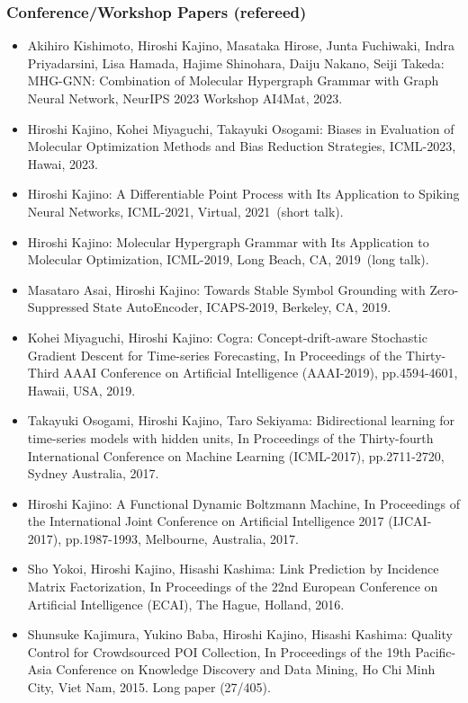 \documentclass[a4paper,9pt]{article}
\begin{document}
\subsubsection*{Conference/Workshop Papers (refereed)}
\begin{itemize}
 \item Akihiro Kishimoto, Hiroshi Kajino, Masataka Hirose, Junta Fuchiwaki, Indra Priyadarsini, Lisa Hamada, Hajime Shinohara, Daiju Nakano, Seiji Takeda: MHG-GNN: Combination of Molecular Hypergraph Grammar with Graph Neural Network, NeurIPS 2023 Workshop AI4Mat, 2023.
 \item Hiroshi Kajino, Kohei Miyaguchi, Takayuki Osogami: Biases in Evaluation of Molecular Optimization Methods and Bias Reduction Strategies, ICML-2023, Hawai, 2023.
 \item Hiroshi Kajino: A Differentiable Point Process with Its Application to Spiking Neural Networks, ICML-2021, Virtual, 2021~(short talk).
 \item Hiroshi Kajino: Molecular Hypergraph Grammar with Its Application to Molecular Optimization, ICML-2019, Long Beach, CA, 2019~(long talk).
 \item Masataro Asai, Hiroshi Kajino: Towards Stable Symbol Grounding with Zero-Suppressed State AutoEncoder, ICAPS-2019, Berkeley, CA, 2019.
 \item Kohei Miyaguchi, Hiroshi Kajino: Cogra: Concept-drift-aware Stochastic Gradient Descent for Time-series Forecasting, In Proceedings of the Thirty-Third AAAI Conference on Artificial Intelligence (AAAI-2019), pp.4594-4601, Hawaii, USA, 2019.
 \item Takayuki Osogami, Hiroshi Kajino, Taro Sekiyama: Bidirectional learning for time-series models with hidden units, In Proceedings of the Thirty-fourth International Conference on Machine Learning (ICML-2017), pp.2711-2720, Sydney Australia, 2017.
 \item Hiroshi Kajino: A Functional Dynamic Boltzmann Machine, In Proceedings of the International Joint Conference on Artificial Intelligence 2017 (IJCAI-2017), pp.1987-1993, Melbourne, Australia, 2017.
 \item Sho Yokoi, Hiroshi Kajino, Hisashi Kashima: Link Prediction by Incidence Matrix Factorization, In Proceedings of the 22nd European Conference on Artificial Intelligence (ECAI), The Hague, Holland, 2016.
 \item Shunsuke Kajimura, Yukino Baba, Hiroshi Kajino, Hisashi Kashima: Quality Control for Crowdsourced POI Collection, In Proceedings of the 19th Pacific-Asia Conference on Knowledge Discovery and Data Mining, Ho Chi Minh City, Viet Nam, 2015. Long paper (27/405).

\end{itemize}
\end{document}
